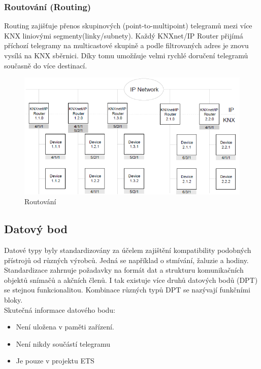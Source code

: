 \subsubsection{Routování (Routing)} 
Routing zajišťuje přenos skupinových (point-to-multipoint) telegramů mezi více KNX liniovými segmenty(linky/subnety). Každý KNXnet/IP Router přijímá příchozí telegramy na multicastové skupině a podle filtrovaných adres je znovu vysílá na KNX sběrnici. Díky tomu umožňuje velmi rychlé doručení telegramů současně do více destinací. \cite{KNXRouting}
\begin{figure}[!h]
  \begin{center}
    \includegraphics[scale=0.6]{obrazky/KNX_Routing.png}
  \end{center}
  \caption[Routování \cite{KNXRouting}]{Routování \cite{KNXRouting}}
  \label{fig:Routovani}
\end{figure}
\subsection{Datový bod}
Datové typy byly standardizovány za účelem zajištění kompatibility podobných přístrojů od různých výrobců. Jedná se například o stmívání, žaluzie a hodiny. Standardizace zahrnuje požadavky na formát dat a strukturu komunikačních objektů snímačů a akčních členů. I tak existuje více druhů datových bodů (DPT) se stejnou funkcionalitou. Kombinace různých typů DPT se nazývají funkčními bloky. \cite{Celkovy prehled}
\\Skutečná informace datového bodu:
\begin{itemize}
    \item Není uložena v paměti zařízení.
    \item Není nikdy součástí telegramu
    \item Je pouze v projektu ETS \newline
\end{itemize}

